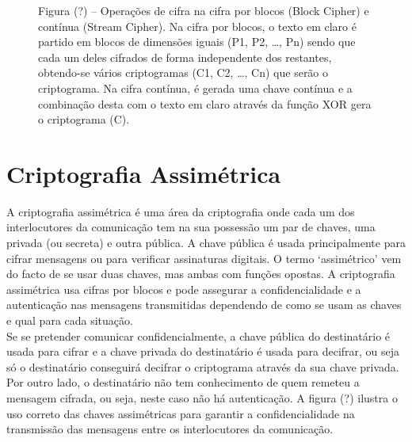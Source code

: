 \documentclass[a4paper,11pt,openright,oneside]{report}
\begin{document}
\begin{figure}[ht]
\center
{}
\caption{Figura (?) – Operações de cifra na cifra por blocos (Block Cipher) e contínua (Stream Cipher). Na cifra por blocos, o texto em claro é partido em blocos de dimensões iguais (P1, P2, …, Pn) sendo que cada um deles cifrados de forma independente dos restantes, obtendo-se vários criptogramas (C1, C2, …, Cn) que serão o criptograma. Na cifra contínua, é gerada uma chave contínua e a combinação desta com o texto em claro através da função XOR gera o criptograma (C).}
\label{fig:crypto2}
\end{figure}

\section{Criptografia Assimétrica}
\label{chap.assimétrica}

A criptografia assimétrica é uma área da criptografia onde cada um dos interlocutores da comunicação tem na sua possessão um par de chaves, uma privada (ou secreta) e outra pública. A chave pública é usada principalmente para cifrar mensagens ou para verificar assinaturas digitais. O termo ‘assimétrico’ vem do facto de se usar duas chaves, mas ambas com funções opostas. A criptografia assimétrica usa cifras por blocos e pode assegurar a confidencialidade e a autenticação nas mensagens transmitidas dependendo de como se usam as chaves e qual para cada situação.\\

Se se pretender comunicar confidencialmente, a chave pública do destinatário é usada para cifrar e a chave privada do destinatário é usada para decifrar, ou seja só o destinatário conseguirá decifrar o criptograma através da sua chave privada. Por outro lado, o destinatário não tem conhecimento de quem remeteu a mensagem cifrada, ou seja, neste caso não há autenticação. A figura (?) ilustra o uso correto das chaves assimétricas para garantir a confidencialidade na transmissão das mensagens entre os interlocutores da comunicação.\\
\end{document}
